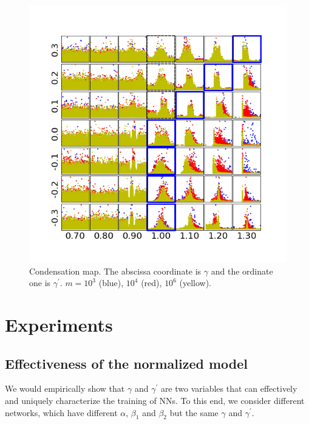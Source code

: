 \documentclass{article}
\begin{document}
\begin{figure}
    \begin{centering}
        \includegraphics[scale=0.8]{pic/systemexplarg3/scalestudy3/angleamptogether.png}
        \par\end{centering}
    \caption{Condensation map. The abscissa coordinate is $\gamma$ and the ordinate one is $\gamma^{\prime}$. $m=10^{3}$ (blue), $10^{4}$ (red), $10^{6}$ (yellow).}\label{fig:cdnmap}
\end{figure}




\section{Experiments}
\subsection{Effectiveness of the normalized  model}

We would empirically show that $\gamma$ and $\gamma^{\prime}$ are two variables that can effectively and uniquely characterize the training of NNs. To this end, we consider different networks, which have different $\alpha$, $\beta_1$ and $\beta_2$ but the same $\gamma$ and $\gamma^{\prime}$.
\end{document}
